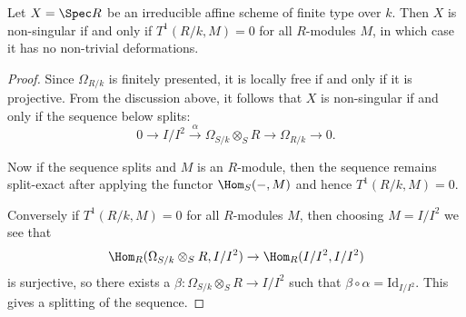 \begin{theorem} 
    Let $X=\Spec R$ be an irreducible affine scheme of finite type over $k$.
    Then $X$ is non-singular if and only if $T^1({R/k},M)=0$ for all $R$-modules
    $M$, in which case it has no non-trivial deformations.  

    \begin{proof} 
        Since \(\Omega_{R/k}\) is finitely presented, it is locally free if and
        only if it is projective. From the discussion above, it follows that
        \(X\) is non-singular if and only  if the sequence below splits: 
        \[0\rightarrow I/I^2\xrightarrow{\alpha}
        \Omega_{S/k}\otimes_SR\to\Omega_{R/k}\rightarrow 0.\]

        Now if the sequence splits and \(M\) is an \(R\)-module, then the
        sequence remains split-exact after applying the functor \(\Hom_S(-,M)\)
        and hence \(T^1(R/k,M)=0\). 

        Conversely if \(T^1(R/k,M)=0\) for all \(R\)-modules \(M\), then
        choosing \(M=I/I^2\) we see that 
        \[\Hom_R(\Omega_{S/k}\otimes_S R, I/I^2) \rightarrow
        \Hom_R(I/I^2,I/I^2)\] 
        is surjective, so there exists a \(\beta: \Omega_{S/k}\otimes_SR
        \rightarrow I/I^2\) such that \(\beta\circ\alpha=\text{Id}_{I/I^2}\).
        This gives a splitting of the sequence.  
    \end{proof}
\end{theorem}
